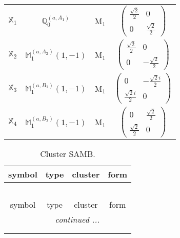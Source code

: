 \documentclass[fleqn,10pt,landscape]{article}
\begin{document}
\begin{itemize}
\begin{center}
\begin{longtable}{c|c|c|c}
$ \mathbb{X}_{1} $ & $\mathbb{Q}_{0}^{(a,A_{1})}$ & M$_{1}$ & $\begin{pmatrix} \frac{\sqrt{2}}{2} & 0 \\ 0 & \frac{\sqrt{2}}{2} \end{pmatrix}$ \\
$ \mathbb{X}_{2} $ & $\mathbb{M}_{1}^{(a,A_{2})}(1,-1)$ & M$_{1}$ & $\begin{pmatrix} \frac{\sqrt{2}}{2} & 0 \\ 0 & - \frac{\sqrt{2}}{2} \end{pmatrix}$ \\
$ \mathbb{X}_{3} $ & $\mathbb{M}_{1}^{(a,B_{1})}(1,-1)$ & M$_{1}$ & $\begin{pmatrix} 0 & - \frac{\sqrt{2} i}{2} \\ \frac{\sqrt{2} i}{2} & 0 \end{pmatrix}$ \\
$ \mathbb{X}_{4} $ & $\mathbb{M}_{1}^{(a,B_{2})}(1,-1)$ & M$_{1}$ & $\begin{pmatrix} 0 & \frac{\sqrt{2}}{2} \\ \frac{\sqrt{2}}{2} & 0 \end{pmatrix}$ \\
\end{longtable}
\end{center}
\begin{center}
\renewcommand{\arraystretch}{1.3}
\begin{longtable}{c|c|c|c}
\caption{Cluster SAMB.}
 \\
 \hline \hline
symbol & type & cluster & form \\ \hline \endfirsthead

\multicolumn{3}{l}{\tablename\ \thetable{}} \\
 \hline \hline
symbol & type & cluster & form \\ \hline \endhead

 \hline \hline
\multicolumn{3}{r}{\footnotesize\it continued ...} \\ \endfoot

 \hline \hline
\multicolumn{3}{r}{} \\ \endlastfoot


\end{longtable}
\end{center}
\end{itemize}
\end{document}
